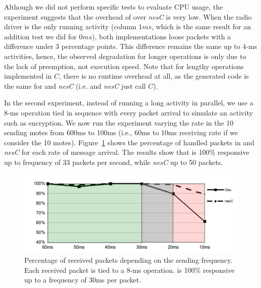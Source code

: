Although we did not perform specific tests to evaluate CPU usage, the 
experiment suggests that the overhead of \CEU over \emph{nesC} is very low.
%
When the radio driver is the only running activity (column $1ms$, which is the 
same result for an addition test we did for $0ms$), both implementations loose 
packets with a difference under 3 percentage points.
This difference remains the same up to 4-ms activities, hence, the observed 
degradation for longer operations is only due to the lack of preemption, not 
execution speed.
%
Note that for lengthy operations implemented in $C$, there is no runtime 
overhead at all, as the generated code is the same for \CEU and \emph{nesC} 
(i.e. \CEU and \emph{nesC} just call $C$).

In the second experiment, instead of running a long activity in parallel, we 
use a 8-ms operation tied in sequence with every packet arrival to simulate an 
activity such as encryption.
We now run the experiment varying the rate in the 10 sending motes from 600ms 
to 100ms (i.e., 60ms to 10ms receiving rate if we consider the 10 motes).
%
Figure~\ref{fig.radio2} shows the percentage of handled packets in \CEU and 
\emph{nesC} for each rate of message arrival.
%
%
The results show that \CEU is 100\% responsive up to frequency of 33 packets 
per second, while \emph{nesC} up to 50 packets.

\begin{figure}[t]
\includegraphics[width=\linewidth,clip=true,trim=5px 0px 5px 0px]{radio2}
\caption{  Percentage of received packets depending on the sending frequency.  
\newline
{\small %
Each received packet is tied to a 8-ms operation.
\CEU is 100\% responsive up to a frequency of 30ms per packet.
}%
\label{fig.radio2}
}
\end{figure}

